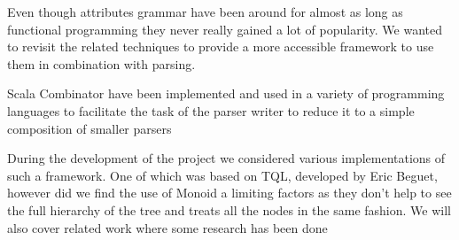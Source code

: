 Even though attributes grammar have been around for almost as long as functional programming they never really gained a lot of popularity. We wanted to revisit the related techniques to provide a more accessible framework to use them in combination with parsing.

Scala Combinator have been implemented and used in a variety of programming languages to facilitate the task of the parser writer to reduce it to a simple composition of smaller parsers

During the development of the project we considered various implementations of such a framework. One of which was based on TQL, developed by Eric Beguet, however did we find the use of Monoid a limiting factors as they don't help to see the full hierarchy of the tree and treats all the nodes in the same fashion.
We will also cover related work where some research has been done 
